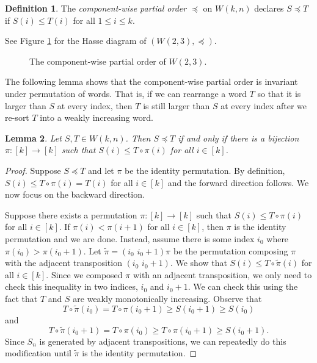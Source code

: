 \documentclass[10pt,a4paper]{amsart}
\theoremstyle{definition}
\newtheorem{defn}{Definition}[section]
\theoremstyle{plain}
\newtheorem{lemma}[defn]{Lemma}
\begin{document}
\begin{defn}\label{defn:cmpt}
  The \emph{component-wise partial order} $\preceq$ on $W(k,n)$ declares $S\preceq T$ if $S(i)\leq T(i)$ for all $1\leq i \leq k$.
\end{defn}
\noindent See Figure \ref{fig:hasse_words} for the Hasse diagram of $(W(2,3), \preceq)$.


\begin{figure}[ht]
\caption{The component-wise partial order of $W(2,3)$.}
\label{fig:hasse_words}
\end{figure}

The following lemma shows that the component-wise partial order is invariant under permutation of words. That is, if we can rearrange a word $T$ so that it is larger than $S$ at every index, then $T$ is still larger than $S$ at every index after we re-sort $T$ into a weakly increasing word.

\begin{lemma}
  \label{lem:weaker_prec}
Let $S,T\in W(k,n)$. Then $S\preceq T$ if and only if there is a bijection $\pi:[k]\to [k]$ such that $S(i)\leq T\circ \pi (i)$ for all $i\in[k]$.
\end{lemma}
\begin{proof}
  Suppose $S\preceq T$ and let $\pi$ be the identity permutation. By definition, $S(i)\leq T\circ \pi(i)= T(i)$ for all $i\in[k]$ and the forward direction follows. We now focus on the backward direction.

  Suppose there exists a permutation $\pi:[k]\to [k]$ such that $S(i)\leq T\circ \pi(i)$ for all $i\in[k]$. If $\pi(i)< \pi(i+1)$ for all $i\in [k]$, then $\pi$ is the identity permutation and we are done. Instead, assume there is some index $i_0$ where $\pi(i_0)> \pi(i_0+1)$. Let $\tilde \pi= (i_0\,\, i_0+1)\pi$ be the permutation composing $\pi$ with the adjacent transposition $(i_0\,\, i_0+1)$. We show that $S(i) \leq T \circ \tilde \pi(i)$ for all $i\in[k]$. Since we composed $\pi$ with an adjacent transposition, we only need to check this inequality in two indices, $i_0$ and $i_0+1$. We can check this using the fact that $T$ and $S$ are weakly monotonically increasing. Observe that
  \[T\circ \tilde \pi(i_0) = T\circ\pi(i_0+1)\ge S(i_0+1) \ge S(i_0)   \]
  and
  \[T\circ \tilde \pi(i_{0}+1) = T\circ\pi(i_0) \geq T\circ \pi(i_0+1) \geq S(i_0+1). \]
 Since $S_n$ is generated by adjacent transpositions, we can repeatedly do this modification until $\tilde \pi$ is the identity permutation.
\end{proof}
\end{document}
